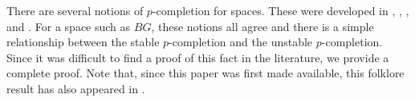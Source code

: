 \documentclass[10pt]{amsart}
\theoremstyle{definition}
\begin{document}

There are several notions of $p$-completion for spaces. These were developed in \cite{Bousfield}, \cite{BousfieldKan}, \cite{Sullivan1}, and \cite{Sullivan2}. For a space such as $BG$, these notions all agree and there is a simple relationship between the stable $p$-completion and the unstable $p$-completion. Since it was difficult to find a proof of this fact in the literature, we provide a complete proof. Note that, since this paper was first made available, this folklore result has also appeared in \cite{BB}.
\end{document}
